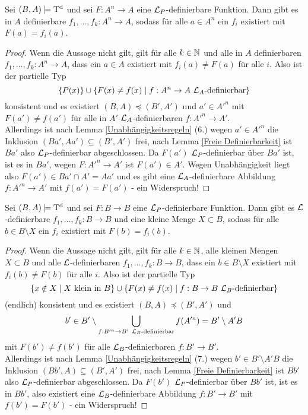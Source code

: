 \begin{lemma}
	Sei $(B,A)\models\operatorname{T^d}$ und sei $F:A^n\rightarrow A$ eine $\mathcal{L}_P$-definierbare Funktion. Dann gibt es in $A$ definierbare $f_1,\dots,f_k:A^n\rightarrow A$, sodass für alle $a\in A^n$ ein $f_i$ existiert mit $F(a)=f_i(a)$.
\end{lemma}
\begin{proof}
	Wenn die Aussage nicht gilt, gilt für alle $k\in\mathbb{N}$ und alle in $A$ definierbaren $f_1,\dots,f_k:A^n\rightarrow A$, dass ein $a\in A$ existiert mit $f_i(a)\neq F(a)$ für alle $i$. Also ist der partielle Typ $$\{P(x)\}\cup\{F(x)\neq f(x)\mid f:A^n\rightarrow A\ \mathcal{L}_A\text{-definierbar}\}$$ konsistent und es existiert $(B,A)\preceq(B',A')$ und $a'\in A'^n$ mit $F(a')\neq f(a')$ für alle in $A'$ $\mathcal{L}_A$-definierbaren $f:A'^n\rightarrow A'$.\\
	Allerdings ist nach Lemma \ref{Unabhängigkeitsregeln} (6.) wegen $a'\in A'^n$ die Inklusion $(Ba',Aa')\subseteq(B',A')$ frei, nach Lemma \ref{Freie Definierbarkeit} ist $Ba'$ also $\mathcal{L}_P$-definierbar abgeschlossen. Da $F(a')$ $\mathcal{L}_P$-definierbar über $Ba'$ ist, ist es in $Ba'$, wegen $F:A'^n\rightarrow A'$ ist $F(a')\in A'$. Wegen Unabhängigkeit liegt also $F(a')\in Ba'\cap A'=Aa'$ und es gibt eine $\mathcal{L}_A$-definierbare Abbildung $f:A'^n\rightarrow A'$ mit $f(a')=F(a')$ - ein Widerspruch!
\end{proof}

\begin{lemma}
	Sei $(B,A)\models\operatorname{T^d}$ und sei $F:B\rightarrow B$ eine $\mathcal{L}_P$-definierbare Funktion. Dann gibt es $\mathcal{L}$-definierbare $f_1,\dots,f_k:B\rightarrow B$ und eine kleine Menge $X\subset B$, sodass für alle $b\in B\setminus X$ ein $f_i$ existiert mit $F(b)=f_i(b)$.
\end{lemma}
\begin{proof}
	Wenn die Aussage nicht gilt, gilt für alle $k\in\mathbb{N}$, alle kleinen Mengen $X\subset B$ und alle $\mathcal{L}$-definierbaren $f_1,\dots,f_k:B\rightarrow B$, dass ein $b\in B\setminus X$ existiert mit $f_i(b)\neq F(b)$ für alle $i$. Also ist der partielle Typ $$\{x\notin X\mid X\text{ klein in }B\}\cup\{F(x)\neq f(x)\mid f:B\rightarrow B\ \lingua_B\text{-definierbar}\}$$ (endlich) konsistent und es existiert $(B,A)\preceq(B',A')$ und $$b'\in B'\setminus\bigcup\limits_{f:B'^n\rightarrow B'\ \lingua_B\text{-definierbar}}f(A'^n)=B'\setminus A'B$$ mit $F(b')\neq f(b')$ für alle $\mathcal{L}_B$-definierbaren $f:B'\rightarrow B'$.\\
	Allerdings ist nach Lemma \ref{Unabhängigkeitsregeln} (7.) wegen $b'\in B'\setminus A'B$ die Inklusion $(Bb',A)\subseteq(B',A')$ frei, nach Lemma \ref{Freie Definierbarkeit} ist $Bb'$ also $\mathcal{L}_P$-definierbar abgeschlossen. Da $F(b')$ $\mathcal{L}_P$-definierbar über $Bb'$ ist, ist es in $Bb'$, also existiert eine $\mathcal{L}_B$-definierbare Abbildung $f:B'\rightarrow B'$ mit $f(b')=F(b')$ - ein Widerspruch!
\end{proof}

